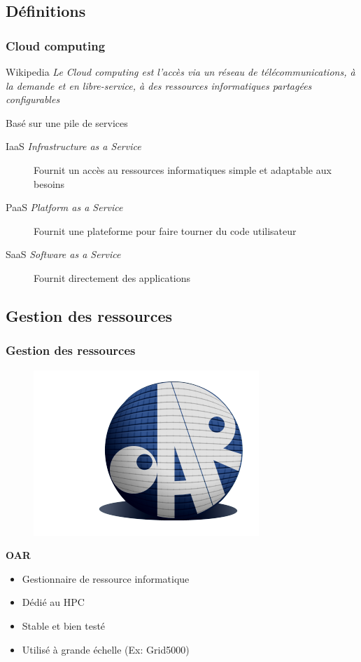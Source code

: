 \documentclass{beamer}
\begin{document}
		\subsection{Définitions}
			\begin{frame}
			  \frametitle{Cloud computing}
			    \begin{block}{Wikipedia}
			      \textit{Le Cloud computing est l'accès via un réseau de télécommunications, à la demande et en libre-service, à des ressources informatiques partagées configurables}
			    \end{block}
			    Basé sur une pile de services
			    \begin{description}
			      \item[IaaS \textit{Infrastructure as a Service}] 
			      Fournit un accès au ressources informatiques simple et adaptable aux besoins
			      \item[PaaS \textit{Platform as a Service}]
			      Fournit une plateforme pour faire tourner du code utilisateur
			      \item[SaaS \textit{Software as a Service}]
			      Fournit directement des applications
			    \end{description}
			\end{frame}
			
		\subsection{Gestion des ressources}
			\begin{frame}
				\frametitle{Gestion des ressources}
				\begin{figure}
			    \includegraphics[scale=0.3]{img/logo_oar.png}
 			  \end{figure}
 			  \textbf{OAR}
 			  \begin{itemize}
   			  \item Gestionnaire de ressource informatique
   			  \item Dédié au HPC
   			  \item Stable et bien testé
   			  \item Utilisé à grande échelle (Ex: Grid5000)
 			  \end{itemize}
			\end{frame}
	
\end{document}
